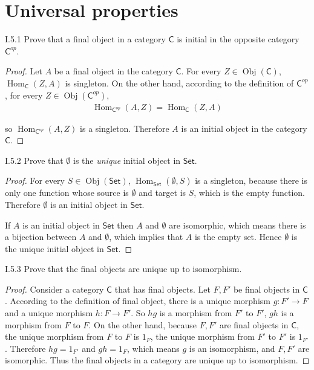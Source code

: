 \section{Universal properties}

\begin{exercise}{I.5.1}
	Prove that a final object in a category $\mathsf{C}$ is initial in the opposite category ${\mathsf{C}}^{op}$.
\end{exercise}

\begin{proof}
	Let $A$ be a final object in the category $\mathsf{C}$. For every $Z\in \operatorname{Obj}(\mathsf{C})$, $\operatorname{Hom}_{\mathsf{C}}(Z, A)$ is singleton. On the other hand, according to the definition of ${\mathsf{C}}^{op}$, for every $Z\in\operatorname{Obj}({\mathsf{C}}^{op})$,
	\begin{align*}
		\operatorname{Hom}_{{\mathsf{C}}^{op}}(A, Z) = \operatorname{Hom}_{\mathsf{C}}(Z, A)
	\end{align*}

	so $\operatorname{Hom}_{{\mathsf{C}}^{op}}(A, Z)$ is a singleton. Therefore $A$ is an initial object in the category $\mathsf{C}$.
\end{proof}

\begin{exercise}{I.5.2}
	Prove that $\emptyset$ is the \textit{unique} initial object in $\mathsf{Set}$.
\end{exercise}

\begin{proof}
	For every $S\in \operatorname{Obj}(\mathsf{Set})$, $\operatorname{Hom}_{\mathsf{Set}}(\emptyset, S)$ is a singleton, because there is only one function whose source is $\emptyset$ and target is $S$, which is the empty function. Therefore $\emptyset$ is an initial object in $\mathsf{Set}$.

	If $A$ is an initial object in $\mathsf{Set}$ then $A$ and $\emptyset$ are isomorphic, which means there is a bijection between $A$ and $\emptyset$, which implies that $A$ is the empty set. Hence $\emptyset$ is the unique initial object in $\mathsf{Set}$.
\end{proof}

\begin{exercise}{I.5.3}
	Prove that the final objects are unique up to isomorphism.
\end{exercise}

\begin{proof}
	Consider a category $\mathsf{C}$ that has final objects. Let $F, F'$ be final objects in $\mathsf{C}$. According to the definition of final object, there is a unique morphism $g: F' \to F$ and a unique morphism $h: F \to F'$. So $hg$ is a morphism from $F'$ to $F'$, $gh$ is a morphism from $F$ to $F$. On the other hand, because $F, F'$ are final objects in $\mathsf{C}$, the unique morphism from $F$ to $F$ is $1_{F}$, the unique morphism from $F'$ to $F'$ is $1_{F'}$. Therefore $hg = 1_{F'}$ and $gh = 1_{F}$, which means $g$ is an isomorphism, and $F, F'$ are isomorphic. Thus the final objects in a category are unique up to isomorphism.
\end{proof}

